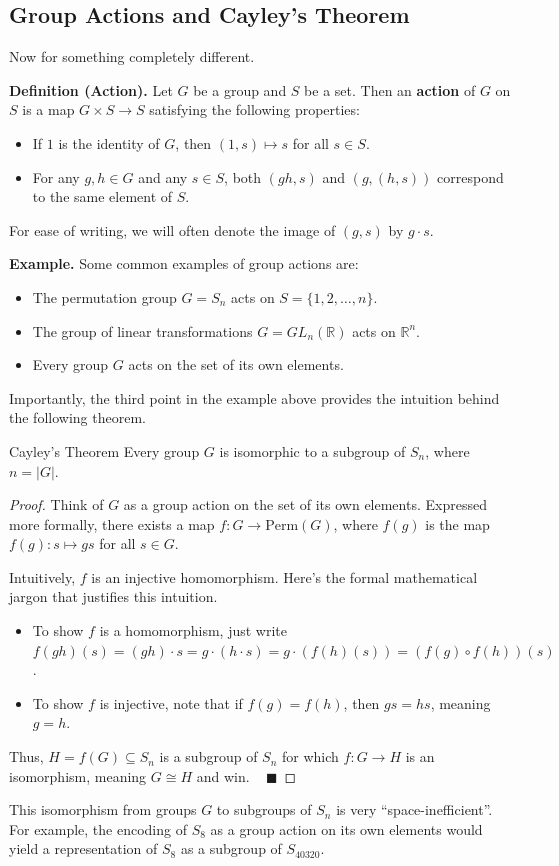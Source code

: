 \subsection{Group Actions and Cayley's Theorem}

Now for something completely different.

\textbf{Definition (Action).} Let $G$ be a group and $S$ be a set.  Then an \textbf{action} of $G$ on $S$ is a map $G \times S \to S$ satisfying the following properties:
\begin{itemize}
    \item If $1$ is the identity of $G$, then $(1, s) \mapsto s$ for all $s \in S$.
    \item For any $g, h \in G$ and any $s \in S$, both $(gh, s)$ and $(g, (h, s))$ correspond to the same element of $S$.
\end{itemize}
For ease of writing, we will often denote the image of $(g, s)$ by $g \cdot s$.

\textbf{Example.} Some common examples of group actions are:
\begin{itemize}
    \item The permutation group $G = S_n$ acts on $S = \{1, 2, \dots, n\}$.
    \item The group of linear transformations $G = GL_n(\mathbb{R})$ acts on $\mathbb{R}^n$.
    \item Every group $G$ acts on the set of its own elements.
\end{itemize}

Importantly, the third point in the example above provides the intuition behind the following theorem.

\begin{theorem}{Cayley's Theorem}
    Every group $G$ is isomorphic to a subgroup of $S_n$, where $n = |G|$.
\end{theorem}

\begin{proof}
    Think of $G$ as a group action on the set of its own elements.  Expressed more formally, there exists a map $f: G \to \mathrm{Perm}(G)$, where $f(g)$ is the map $f(g): s \mapsto gs$ for all $s \in G$.

    Intuitively, $f$ is an injective homomorphism.  Here's the formal mathematical jargon that justifies this intuition.
    \begin{itemize}
        \item To show $f$ is a homomorphism, just write $f(gh)(s) = (gh) \cdot s = g \cdot (h \cdot s) = g \cdot (f(h)(s)) = (f(g) \circ f(h))(s)$.
        \item To show $f$ is injective, note that if $f(g) = f(h)$, then $gs = hs$, meaning $g = h$.
    \end{itemize}
    Thus, $H = f(G) \subseteq S_n$ is a subgroup of $S_n$ for which $f: G \to H$ is an isomorphism, meaning $G \cong H$ and win. ~ $\blacksquare$
\end{proof}

\begin{remark}
    This isomorphism from groups $G$ to subgroups of $S_n$ is very ``space-inefficient''.  For example, the encoding of $S_8$ as a group action on its own elements would yield a representation of $S_8$ as a subgroup of $S_{40320}$.
\end{remark}

